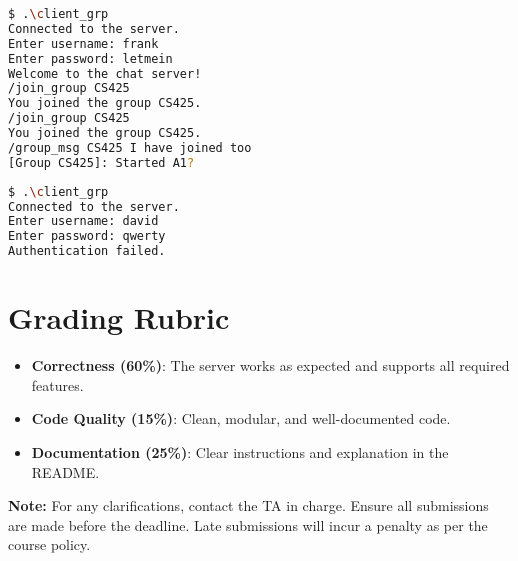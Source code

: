 \documentclass[12pt,a4paper]{article}
\begin{document}
\begin{lstlisting}[language=bash, caption={Running another client in the fourth Terminal; Note that frank does not receive the group message till he joins the group}]
$ .\client_grp
Connected to the server.
Enter username: frank
Enter password: letmein
Welcome to the chat server!
/join_group CS425
You joined the group CS425.
/join_group CS425           
You joined the group CS425.
/group_msg CS425 I have joined too
[Group CS425]: Started A1?
\end{lstlisting}

\begin{lstlisting}[language=bash, caption={Running another client in the fifth Terminal}]
$ .\client_grp
Connected to the server.
Enter username: david
Enter password: qwerty
Authentication failed.
\end{lstlisting}

\section*{Grading Rubric}
\begin{itemize}
    \item \textbf{Correctness (60\%)}: The server works as expected and supports all required features.
    \item \textbf{Code Quality (15\%)}: Clean, modular, and well-documented code.
    \item \textbf{Documentation (25\%)}: Clear instructions and explanation in the README.
\end{itemize}

\vfill
\noindent \textbf{Note:} For any clarifications, contact the TA in charge. Ensure all submissions are made before the deadline. Late submissions will incur a penalty as per the course policy.
\end{document}
